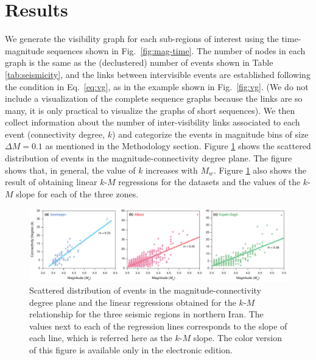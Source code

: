 
\section{Results}

We generate the visibility graph for each sub-regions of interest using the time-magnitude sequences shown in Fig.~\ref{fig:mag-time}. The number of nodes in each graph is the same as the (declustered) number of events shown in Table \ref{tab:seismicity}, and the links between intervisible events are established following the condition in Eq.~\ref{eq:vg}, as in the example shown in Fig.~\ref{fig:vg}. (We do not include a visualization of the complete sequence graphs because the links are so many, it is only practical to visualize the graphs of short sequences). We then collect information about the number of inter-visibility links associated to each event (connectivity degree, $k$) and categorize the events in magnitude bins of size $\Delta M = 0.1$ as mentioned in the Methodology section. Figure \ref{fig:km} shows the scattered distribution of events in the magnitude-connectivity degree plane. The figure shows that, in general, the value of $k$ increases with $M_w$. Figure \ref{fig:km} also shows the result of obtaining linear $k$-$M$ regressions for the datasets and the values of the $k$-$M$ slope for each of the three zones.

\begin{figure}[t]
	\centering
	\includegraphics[width=\textwidth]{figures/pdf/figure-06} 
	\caption{Scattered distribution of events in the magnitude-connectivity degree plane and the linear regressions obtained for the $k$-$M$ relationship for the three seismic regions in northern Iran. The values next to each of the regression lines corresponds to the slope of each line, which is referred here as the $k$-$M$ slope. The color version of this figure is available only in the electronic edition.}
	\label{fig:km}
\end{figure}

